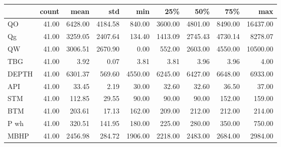 \begin{tabular}{lrrrrrrrr}
\toprule
{} &  count &    mean &     std &     min &     25\% &     50\% &     75\% &      max \\
\midrule
QO    &  41.00 & 6428.00 & 4184.58 &  840.00 & 3600.00 & 4801.00 & 8490.00 & 16437.00 \\
Qg    &  41.00 & 3259.05 & 2407.64 &  134.40 & 1413.09 & 2745.43 & 4730.14 &  8278.07 \\
QW    &  41.00 & 3006.51 & 2670.90 &    0.00 &  552.00 & 2603.00 & 4550.00 & 10500.00 \\
TBG   &  41.00 &    3.92 &    0.07 &    3.81 &    3.81 &    3.96 &    3.96 &     4.00 \\
DEPTH &  41.00 & 6301.37 &  569.60 & 4550.00 & 6245.00 & 6427.00 & 6648.00 &  6933.00 \\
API   &  41.00 &   33.45 &    2.19 &   30.00 &   32.60 &   32.60 &   36.50 &    37.00 \\
STM   &  41.00 &  112.85 &   29.55 &   90.00 &   90.00 &   90.00 &  152.00 &   159.00 \\
BTM   &  41.00 &  203.61 &   17.13 &  162.00 &  209.00 &  212.00 &  212.00 &   214.00 \\
P wh  &  41.00 &  320.51 &  141.95 &  180.00 &  225.00 &  280.00 &  350.00 &   750.00 \\
MBHP  &  41.00 & 2456.98 &  284.72 & 1906.00 & 2218.00 & 2483.00 & 2684.00 &  2984.00 \\
\bottomrule
\end{tabular}
